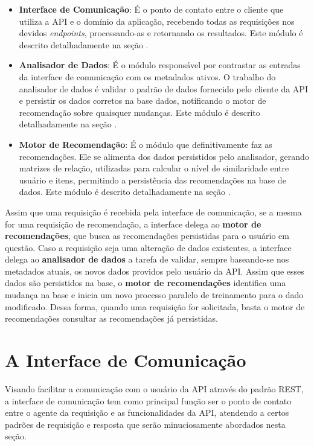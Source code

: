 \documentclass[12pt, openright, oneside, a4paper, brazil]{abntex2}
\begin{document}
\begin{itemize}
	\item \textbf{Interface de Comunicação}: É o ponto de contato entre o cliente que utiliza a API e o domínio da aplicação, recebendo todas as requisições nos devidos \textit{endpoints}, processando-as e retornando os resultados. Este módulo é descrito detalhadamente na seção .

	\item \textbf{Analisador de Dados}: É o módulo responsável por contrastar as entradas da interface de comunicação com os metadados ativos. O trabalho do analisador de dados é validar o padrão de dados fornecido pelo cliente da API e persistir os dados corretos na base dados, notificando o motor de recomendação sobre quaisquer mudanças. Este módulo é descrito detalhadamente na seção .

	\item \textbf{Motor de Recomendação}: É o módulo que definitivamente faz as recomendações. Ele se alimenta dos dados persistidos pelo analisador, gerando matrizes de relação, utilizadas para calcular o nível de similaridade entre usuário e itens, permitindo a persistência das recomendações na base de dados. Este módulo é descrito detalhadamente na seção .
\end{itemize}

Assim que uma requisição é recebida pela interface de comunicação, se a mesma for uma requisição de recomendação, a interface delega ao \textbf{motor de recomendações}, que busca as recomendações persistidas para o usuário em questão. Caso a requisição seja uma alteração de dados existentes, a interface delega ao \textbf{analisador de dados} a tarefa de validar, sempre baseando-se nos metadados atuais, os novos dados providos pelo usuário da API. Assim que esses dados são persistidos na base, o \textbf{motor de recomendações} identifica uma mudança na base e inicia um novo processo paralelo de treinamento para o dado modificado. Dessa forma, quando uma requisição for solicitada, basta o motor de recomendações consultar as recomendações já persistidas.

\section{A Interface de Comunicação} \label{interface}

Visando facilitar a comunicação com o usuário da API através do padrão REST, a interface de comunicação tem como principal função ser o ponto de contato entre o agente da requisição e as funcionalidades da API, atendendo a certos padrões de requisição e resposta que serão minuciosamente abordados nesta seção.
\end{document}
